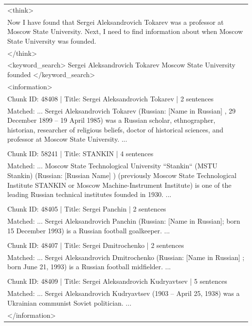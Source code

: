 \documentclass[11pt]{article}
\begin{document}
\begin{longtable}{|p{}|}
\textless{}think\textgreater{} \\
Now I have found that Sergei Aleksandrovich Tokarev was a professor at Moscow State University. Next, I need to find information about when Moscow State University was founded. \\
\textless{}/think\textgreater{} \\
\textless{}keyword\_search\textgreater{} Sergei Aleksandrovich Tokarev Moscow State University founded \textless{}/keyword\_search\textgreater{} \\
\hline

\textless{}information\textgreater{} \\
Chunk ID: 48408 | Title: Sergei Aleksandrovich Tokarev | 2 sentences \\
Matched: ... Sergei Aleksandrovich Tokarev (Russian: [Name in Russian] , 29 December 1899 – 19 April 1985) was a Russian scholar, ethnographer, historian, researcher of religious beliefs, doctor of historical sciences, and professor at Moscow State University. ... \\
\\
Chunk ID: 58241 | Title: STANKIN | 4 sentences \\
Matched: ... Moscow State Technological University “Stankin“ (MSTU Stankin) (Russian: [Russian Name] ) (previously Moscow State Technological Institute STANKIN or Moscow Machine-Instrument Institute) is one of the leading Russian technical institutes founded in 1930. ... \\
\\
Chunk ID: 48405 | Title: Sergei Panchin | 2 sentences \\
Matched: ... Sergei Aleksandrovich Panchin (Russian: [Name in Russian]; born 15 December 1993) is a Russian football goalkeeper. ... \\
\\
Chunk ID: 48407 | Title: Sergei Dmitrochenko | 2 sentences \\
Matched: ... Sergei Aleksandrovich Dmitrochenko (Russian: [Name in Russian] ; born June 21, 1993) is a Russian football midfielder. ... \\
\\
Chunk ID: 48409 | Title: Sergei Aleksandrovich Kudryavtsev | 5 sentences \\
Matched: ... Sergei Aleksandrovich Kudryavtsev (1903 – April 25, 1938) was a Ukrainian communist Soviet politician. ... \\
\textless{}/information\textgreater{} \\
\hline


\end{longtable}
\end{document}
